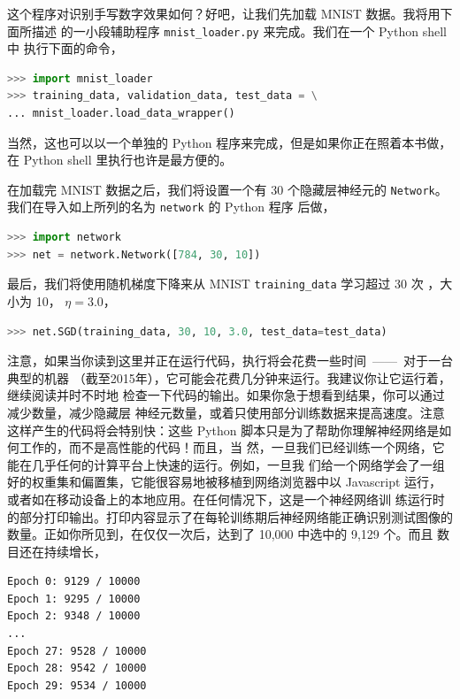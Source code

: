 

这个程序对识别手写数字效果如何？好吧，让我们先加载 MNIST 数据。我将用下面所描述
的一小段辅助程序 \lstinline!mnist_loader.py! 来完成。我们在一个 Python shell 中
执行下面的命令，

\begin{lstlisting}[language=Python]
>>> import mnist_loader
>>> training_data, validation_data, test_data = \
... mnist_loader.load_data_wrapper()
\end{lstlisting}

当然，这也可以以一个单独的 Python 程序来完成，但是如果你正在照着本书做，在
Python shell 里执行也许是最方便的。

在加载完 MNIST 数据之后，我们将设置一个有 30 个隐藏层神经元的
\lstinline!Network!。我们在导入如上所列的名为 \lstinline!network! 的 Python 程序
后做，

\begin{lstlisting}[language=Python]
>>> import network
>>> net = network.Network([784, 30, 10])
\end{lstlisting}

最后，我们将使用随机梯度下降来从 MNIST \lstinline!training_data! 学习超过 30 次%
\epochs{}，\minibatch{}大小为 10，\learningrate{} $\eta = 3.0$，

\begin{lstlisting}[language=Python]
>>> net.SGD(training_data, 30, 10, 3.0, test_data=test_data)
\end{lstlisting}

注意，如果当你读到这里并正在运行代码，执行将会花费一些时间~——~对于一台典型的机器
（截至2015年），它可能会花费几分钟来运行。我建议你让它运行着，继续阅读并时不时地
检查一下代码的输出。如果你急于想看到结果，你可以通过减少\epochs{}数量，减少隐藏层
神经元数量，或着只使用部分训练数据来提高速度。注意这样产生的代码将会特别快：这些
Python 脚本只是为了帮助你理解神经网络是如何工作的，而不是高性能的代码！而且，当
然，一旦我们已经训练一个网络，它能在几乎任何的计算平台上快速的运行。例如，一旦我
们给一个网络学会了一组好的权重集和偏置集，它能很容易地被移植到网络浏览器中以
Javascript 运行，或者如在移动设备上的本地应用。在任何情况下，这是一个神经网络训
练运行时的部分打印输出。打印内容显示了在每轮训练期后神经网络能正确识别测试图像的
数量。正如你所见到，在仅仅一次\epoch{}后，达到了 10,000 中选中的 9,129 个。而且
数目还在持续增长，

\begin{lstlisting}[language=sh]
Epoch 0: 9129 / 10000
Epoch 1: 9295 / 10000
Epoch 2: 9348 / 10000
...
Epoch 27: 9528 / 10000
Epoch 28: 9542 / 10000
Epoch 29: 9534 / 10000
\end{lstlisting}

